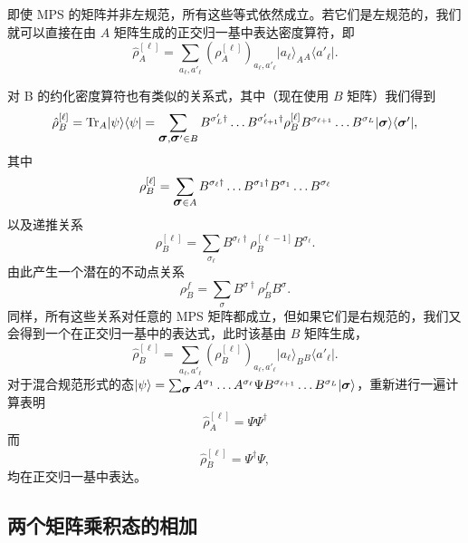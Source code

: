 \documentclass[a4paper,10pt,oneside,onecolumn,1p,times]{elsarticle}
\newcommand{\tr}{{\rm Tr }}
\newcommand{\bra}[1]{\mbox{$\langle #1  |$}}
\newcommand{\ket}[1]{\mbox{$| #1  \rangle$}}
\newcommand{\fat}[1]{\mbox{\boldmath$#1$\unboldmath}}	%
\begin{document}
即使 MPS 的矩阵并非左规范，所有这些等式依然成立。若它们是左规范的，我们就可以直接在由 $A$ 矩阵生成的正交归一基中表达密度算符，即
\begin{equation}
\hat{\rho}_A^{[\ell]} = \sum_{a_\ell, a'_\ell} (\rho_A^{[\ell]})_{a_\ell, a'_\ell} \ket{a_\ell}_A \phantom{{}}_A\bra{a'_\ell} .
\end{equation}

对 B 的约化密度算符也有类似的关系式，其中（现在使用 $B$ 矩阵）我们得到
\begin{equation}
\hat{\rho}_B^{[\ell]} = \tr_A \ket{\psi}\bra{\psi} = \sum_{\fat{\sigma},\fat{\sigma}'\in B} 
B^{\sigma'_L\dagger} \ldots B^{\sigma'_{\ell+1}\dagger} \rho_B^{[\ell]} B^{\sigma_{\ell+1}} \ldots B^{\sigma_L} \ket{\fat{\sigma}} \bra{\fat{\sigma}'} ,
\end{equation}
其中
\begin{equation}
\rho_B^{[\ell]} =  \sum_{\fat{\sigma}\in A} B^{\sigma_{\ell}\dagger} \ldots B^{\sigma_1\dagger} B^{\sigma_1} \ldots B^{\sigma_{\ell} }
\end{equation}
以及递推关系
\begin{equation}
\rho_B^{[\ell]} = \sum_{\sigma_\ell} B^{\sigma_\ell\dagger} \rho_B^{[\ell-1]} B^{\sigma_\ell} .
\label{eq:rhobrecursion}
\end{equation}
由此产生一个潜在的不动点关系
\begin{equation}
\rho_B^f = \sum_{\sigma} B^{\sigma\dagger} \rho_B^{f} B^{\sigma} .
\end{equation}
同样，所有这些关系对任意的 MPS 矩阵都成立，但如果它们是右规范的，我们又会得到一个在正交归一基中的表达式，此时该基由 $B$ 矩阵生成，
\begin{equation}
\hat{\rho}_B^{[\ell]} = \sum_{a_\ell, a'_\ell} (\rho_B^{[\ell]})_{a_\ell, a'_\ell} \ket{a_\ell}_B \phantom{{}}_B\bra{a'_\ell} .
\end{equation}
对于混合规范形式的态$\ket{\psi}=\sum_{\fat{\sigma}} A^{\sigma_1}\ldots A^{\sigma_\ell}\Psi B^{\sigma_{\ell+1}} \ldots B^{\sigma_L} \ket{\fat{\sigma}}$，重新进行一遍计算表明
\begin{equation}
\hat{\rho}^{[\ell]}_A = \Psi \Psi^\dagger
\end{equation}
而
\begin{equation}
\hat{\rho}^{[\ell]}_B = \Psi^\dagger\Psi ,
\end{equation}
均在正交归一基中表达。

\subsection{两个矩阵乘积态的相加}
\end{document}
